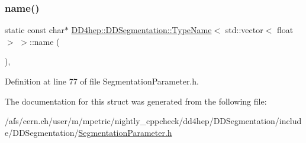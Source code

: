 \subsubsection{\texorpdfstring{name()}{name()}}
{\footnotesize\ttfamily static const char$\ast$ \hyperlink{struct_d_d4hep_1_1_d_d_segmentation_1_1_type_name}{D\+D4hep\+::\+D\+D\+Segmentation\+::\+Type\+Name}$<$ std\+::vector$<$ float $>$ $>$\+::name (\begin{DoxyParamCaption}{ }\end{DoxyParamCaption})\hspace{0.3cm}{\ttfamily [inline]}, {\ttfamily [static]}}



Definition at line 77 of file Segmentation\+Parameter.\+h.



The documentation for this struct was generated from the following file\+:\begin{DoxyCompactItemize}
\item 
/afs/cern.\+ch/user/m/mpetric/nightly\+\_\+cppcheck/dd4hep/\+D\+D\+Segmentation/include/\+D\+D\+Segmentation/\hyperlink{_segmentation_parameter_8h}{Segmentation\+Parameter.\+h}\end{DoxyCompactItemize}
